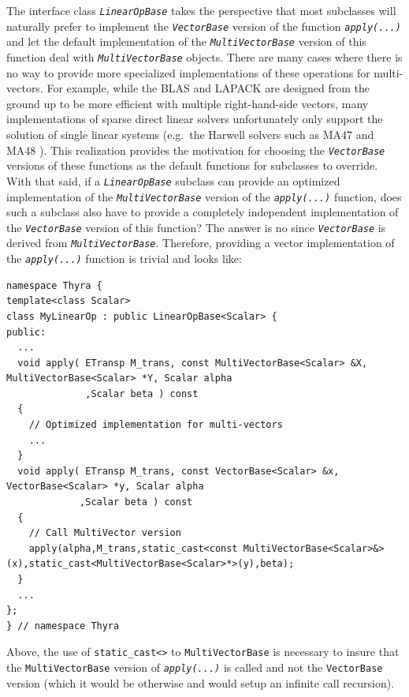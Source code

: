 \documentclass[pdf,ps2pdf,11pt]{SANDreport}
\begin{document}
The interface class {}\texttt{\textit{Linear\-Op\-Base}} takes the perspective
that most subclasses will naturally prefer to implement the
{}\texttt{\textit{Vector\-Base}} version of the function
{}\texttt{\textit{apply(\-...)}} and let the default implementation of
the {}\texttt{\textit{Multi\-Vector\-Base}} version of this function deal with
{}\texttt{\textit{Multi\-Vector\-Base}} objects.  There are many cases where
there is no way to provide more specialized implementations of these
operations for multi-vectors.  For example, while the BLAS and LAPACK
are designed from the ground up to be more efficient with multiple
right-hand-side vectors, many implementations of sparse direct linear
solvers unfortunately only support the solution of single linear
systems (e.g.~the Harwell solvers such as MA47 and MA48
{}\cite{ref:hsl_1995}).  This realization provides the motivation for
choosing the {}\texttt{\textit{Vector\-Base}} versions of these functions as
the default functions for subclasses to override.  With that said, if a
{}\texttt{\textit{Linear\-Op\-Base}} subclass can provide an optimized
implementation of the {}\texttt{\textit{Multi\-Vector\-Base}} version of the
{}\texttt{\textit{apply(\-...)}} function, does such a subclass also
have to provide a completely independent implementation of the
{}\texttt{\textit{Vector\-Base}} version of this function?  The answer is no
since {}\texttt{\textit{Vector\-Base}} is derived from
{}\texttt{\textit{Multi\-Vector\-Base}}.  Therefore, providing a vector
implementation of the {}\texttt{\textit{apply(\-...)}} function
is trivial and looks like:

{\scriptsize\begin{verbatim}
namespace Thyra {
template<class Scalar>
class MyLinearOp : public LinearOpBase<Scalar> {
public:
  ...
  void apply( ETransp M_trans, const MultiVectorBase<Scalar> &X, MultiVectorBase<Scalar> *Y, Scalar alpha
              ,Scalar beta ) const
  {
    // Optimized implementation for multi-vectors
    ...
  }
  void apply( ETransp M_trans, const VectorBase<Scalar> &x, VectorBase<Scalar> *y, Scalar alpha
             ,Scalar beta ) const
  {
    // Call MultiVector version
    apply(alpha,M_trans,static_cast<const MultiVectorBase<Scalar>&>(x),static_cast<MultiVectorBase<Scalar>*>(y),beta);
  }
  ...
};
} // namespace Thyra
\end{verbatim}}

Above, the use of {}\texttt{static\_\-cast<>} to
{}\texttt{Multi\-Vector\-Base} is necessary to insure that the
{}\texttt{Multi\-Vector\-Base} version of {}\texttt{\textit{apply(\-...)}}
is called and not the {}\texttt{Vector\-Base} version (which it would be
otherwise and would setup an infinite call recursion).
\end{document}
